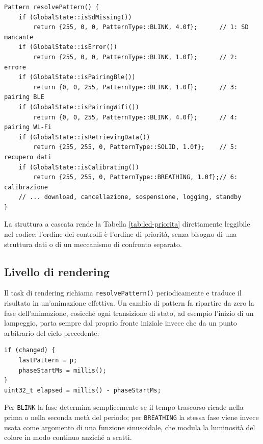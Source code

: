 \begin{listing}[H]
\begin{verbatim}
Pattern resolvePattern() {
    if (GlobalState::isSdMissing())
        return {255, 0, 0, PatternType::BLINK, 4.0f};      // 1: SD mancante
    if (GlobalState::isError())
        return {255, 0, 0, PatternType::BLINK, 1.0f};      // 2: errore
    if (GlobalState::isPairingBle())
        return {0, 0, 255, PatternType::BLINK, 1.0f};      // 3: pairing BLE
    if (GlobalState::isPairingWifi())
        return {0, 0, 255, PatternType::BLINK, 4.0f};      // 4: pairing Wi-Fi
    if (GlobalState::isRetrievingData())
        return {255, 255, 0, PatternType::SOLID, 1.0f};    // 5: recupero dati
    if (GlobalState::isCalibrating())
        return {255, 255, 0, PatternType::BREATHING, 1.0f};// 6: calibrazione
    // ... download, cancellazione, sospensione, logging, standby
}
\end{verbatim}
\caption{Risoluzione del pattern per priorità esplicita (troncato per brevità)}
\label{listing:resolve-pattern}
\end{listing}

La struttura a cascata rende la Tabella \ref{tab:led-priorita} direttamente
leggibile nel codice: l'ordine dei controlli è l'ordine di priorità,
senza bisogno di una struttura dati o di un meccanismo di confronto separato.

\subsection{Livello di rendering}
Il task di rendering richiama \texttt{resolvePattern()} periodicamente e
traduce il risultato in un'animazione effettiva. Un cambio di pattern fa ripartire 
da zero la fase dell'animazione, cosicché ogni
transizione di stato, ad esempio l'inizio di un lampeggio, parta sempre dal
proprio fronte iniziale invece che da un punto arbitrario del ciclo
precedente:

\begin{listing}[H]
\begin{verbatim}
if (changed) {
    lastPattern = p;
    phaseStartMs = millis();
}
uint32_t elapsed = millis() - phaseStartMs;
\end{verbatim}
\caption{Aggancio della fase dell'animazione al cambio di pattern}
\label{listing:led-phase}
\end{listing}

Per \texttt{BLINK} la fase determina semplicemente se il tempo trascorso
ricade nella prima o nella seconda metà del periodo; per \texttt{BREATHING}
la stessa fase viene invece usata come argomento di una funzione sinusoidale,
che modula la luminosità del colore in modo continuo anziché a scatti.

